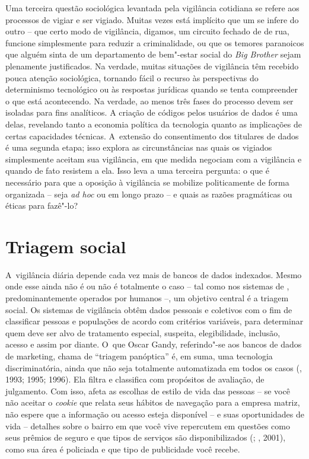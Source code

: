 Uma terceira questão sociológica levantada pela vigilância cotidiana se
refere aos processos de vigiar e ser vigiado. Muitas vezes está
implícito que um se infere do outro -- que certo modo de vigilância,
digamos, um circuito fechado de  de rua, funcione simplesmente para
reduzir a criminalidade, ou que os temores paranoicos que alguém sinta
de um departamento de bem"-estar social do \emph{Big Brother} sejam
plenamente justificados. Na verdade, muitas situações de vigilância têm
recebido pouca atenção sociológica, tornando fácil o recurso às
perspectivas do determinismo tecnológico ou às respostas jurídicas
quando se tenta compreender o que está acontecendo. Na verdade, ao menos
três fases do processo devem ser isoladas para fins analíticos. A
criação de códigos pelos usuários de dados é uma delas, revelando tanto
a economia política da tecnologia quanto as implicações de certas
capacidades técnicas. A~extensão do consentimento dos titulares de dados
é uma segunda etapa; isso explora as circunstâncias nas quais os
vigiados simplesmente aceitam sua vigilância, em que medida negociam com
a vigilância e quando de fato resistem a ela. Isso leva a uma terceira
pergunta: o que é necessário para que a oposição à vigilância se
mobilize politicamente de forma organizada -- seja \emph{ad hoc} ou em
longo prazo -- e quais as razões pragmáticas ou éticas para fazê"-lo?

\section{Triagem social}

A~vigilância diária depende cada vez mais de bancos de dados indexados.
Mesmo onde esse ainda não é ou não é totalmente o caso -- tal como nos
sistemas de , predominantemente operados por humanos --, um
objetivo central é a triagem social. Os sistemas de vigilância obtêm
dados pessoais e coletivos com o fim de classificar pessoas e populações
de acordo com critérios variáveis, para determinar quem deve ser alvo de
tratamento especial, suspeita, elegibilidade, inclusão, acesso e assim
por diante. O~que Oscar Gandy, referindo"-se aos bancos de dados de
marketing, chama de ``triagem panóptica'' é, em suma, uma tecnologia
discriminatória, ainda que não seja totalmente automatizada em todos os
casos (, 1993; 1995; 1996). Ela filtra e classifica com propósitos
de avaliação, de julgamento. Com isso, afeta as escolhas de estilo de
vida das pessoas -- se você não aceitar o \emph{cookie} que relata seus
hábitos de navegação para a empresa matriz, não espere que a informação
ou acesso esteja disponível -- e suas oportunidades de vida --
detalhes sobre o bairro em que você vive repercutem em questões como
seus prêmios de seguro e que tipos de serviços são disponibilizados
(; , 2001), como sua área é policiada e que tipo de
publicidade você recebe.

